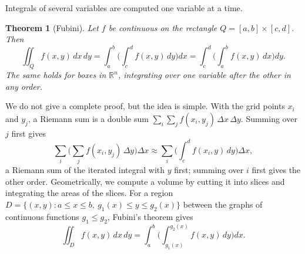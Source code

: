 \documentclass[11pt]{article}
\theoremstyle{definition}
\theoremstyle{plain}
\newtheorem{theorem}[definition]{Theorem}
\theoremstyle{remark}
\begin{document}
Integrals of several variables are computed one variable at a time.

\begin{theorem}[Fubini]\label{thm:fubini}
    Let $f$ be continuous on the rectangle $Q = [a, b] \times [c, d]$. Then
    \[\iint_Q f(x, y)\, dx\, dy = \int_a^b \bigg(\int_c^d f(x, y)\, dy\bigg) dx = \int_c^d \bigg(\int_a^b f(x, y)\, dx\bigg) dy.\]
    The same holds for boxes in $\mathbb{R}^n$, integrating over one variable after the other in any order.
\end{theorem}

We do not give a complete proof, but the idea is simple. With the grid points $x_i$ and $y_j$, a Riemann sum is a double sum $\sum_i\sum_j f(x_i, y_j)\,\Delta x\,\Delta y$. Summing over $j$ first gives
\[\sum_i \Big(\sum_j f(x_i, y_j)\,\Delta y\Big)\Delta x \approx \sum_i \bigg(\int_c^d f(x_i, y)\, dy\bigg)\Delta x,\]
a Riemann sum of the iterated integral with $y$ first; summing over $i$ first gives the other order. Geometrically, we compute a volume by cutting it into slices and integrating the areas of the slices. For a region $D = \{(x, y) : a \leq x \leq b, \ g_1(x) \leq y \leq g_2(x)\}$ between the graphs of continuous functions $g_1 \leq g_2$, Fubini's theorem gives
\[\iint_D f(x, y)\, dx\, dy = \int_a^b \bigg(\int_{g_1(x)}^{g_2(x)} f(x, y)\, dy\bigg) dx.\]
\end{document}
